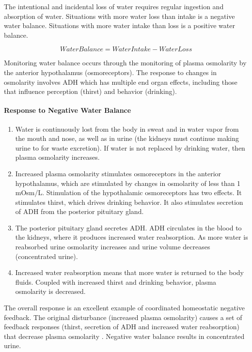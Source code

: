 The intentional and incidental loss of water requires regular ingestion and absorption of water. Situations with more water loss than intake is a negative water balance. Situations with more water intake than loss is a positive water balance.

\begin{equation}
    Water Balance = Water Intake - Water Loss
    \label{water_balance}
\end{equation}

Monitoring water balance occurs through the monitoring of plasma osmolarity by the anterior hypothalamus (osmoreceptors). The response to changes in osmolarity involves ADH which has multiple end organ effects, including those that influence perception (thirst) and behavior (drinking). 

\paragraph{Response to Negative Water Balance}

\begin{enumerate}
\item Water is continuously lost from the body in sweat and in water vapor from the mouth and nose, as well as in urine (the kidneys must continue making urine to for waste excretion). If water is not replaced by drinking water, then plasma osmolarity increases. 
\item Increased plasma osmolarity stimulates osmoreceptors in the anterior hypothalamus, which are stimulated by changes in osmolarity of less than 1 mOsm/L. Stimulation of the hypothalamic osmoreceptors has two effects. It stimulates thirst, which drives drinking behavior. It also stimulates secretion of ADH from the posterior pituitary gland. 
\item The posterior pituitary gland secretes ADH. ADH circulates in the blood to the kidneys, where it produces increased water reabsorption. As more water is reabsorbed urine osmolarity increases and urine volume decreases (concentrated urine). 
\item Increased water reabsorption means that more water is returned to the body fluids. Coupled with increased thirst and drinking behavior, plasma osmolarity is decreased.
\end{enumerate}

The overall response is an excellent example of coordinated homeostatic negative feedback.  The original disturbance (increased plasma osmolarity) causes a set of feedback responses (thirst, secretion of ADH and increased water reabsorption) that decrease plasma osmolarity \cite{hall_guyton_2020}. Negative water balance results in concentrated urine.

